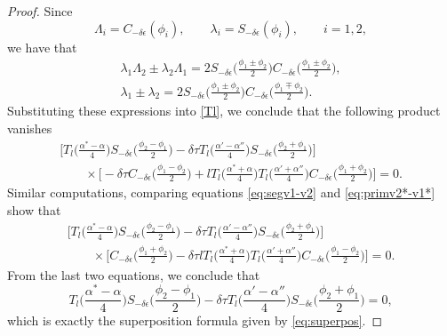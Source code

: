 \documentclass[pdftex]{sigma}
\numberwithin{equation}{section}
\begin{document}
\begin{proof}
Since
\[
\Lambda_i=C_{-\delta\epsilon}(\phi_i) , \qquad \lambda_i=S_{-\delta\epsilon}(\phi_i), \qquad i=1,2,
\]
we have that
\begin{gather*}
\lambda_1\Lambda_2\pm\lambda_2\Lambda_1=2
S_{-\delta\epsilon}\biggl(\frac{\phi_1\pm \phi_2}{2}\biggr)C_{-\delta\epsilon}\biggl(\frac{\phi_1\pm \phi_2}{2}\biggr),
\\
\lambda_1\pm\lambda_2= 2 S_{-\delta\epsilon}\biggl(\frac{\phi_1\pm \phi_2}{2}\biggr)
C_{-\delta\epsilon}\biggl(\frac{\phi_1\mp \phi_2}{2}\biggr).
\end{gather*}
Substituting these expressions into \eqref{Tl}, we conclude that the following product vanishes
\begin{gather*}
 \biggl[T_l\biggl(\frac{\alpha^*-\alpha}{4}\biggr) S_{-\delta\epsilon}\biggl(\frac{\phi_2-\phi_1}{2}\biggr)-\delta\tau
T_l\biggl(\frac{\alpha'-\alpha''}{4}\biggr) S_{-\delta\epsilon}\biggl(\frac{\phi_2+\phi_1}{2}\biggr)\biggr] \\
 \qquad{}\times\biggl[ -\delta\tau C_{-\delta\epsilon}\biggl(\frac{\phi_1-\phi_2}{2}\biggr)+l T_l\biggl(\frac{\alpha^*+\alpha}{4}\biggr)
T_l\biggl(\frac{\alpha'+\alpha''}{4}\biggr) C_{-\delta\epsilon}\biggl(\frac{\phi_1+\phi_2}{2}\biggr) \biggr]=0.
\end{gather*}
Similar computations, comparing equations \eqref{eq:segv1-v2} and \eqref{eq:primv2*-v1*}
show that
\begin{gather*}
 \biggl[T_l\biggl(\frac{\alpha^*-\alpha}{4}\biggr) S_{-\delta\epsilon}\biggl(\frac{\phi_2-\phi_1}{2}\biggr)-\delta\tau
T_l\biggl(\frac{\alpha'-\alpha''}{4}\biggr) S_{-\delta\epsilon}\biggl(\frac{\phi_2+\phi_1}{2}\biggr)\biggr] \\
 \qquad{}\times\biggl[ C_{-\delta\epsilon}\biggl(\frac{\phi_1+\phi_2}{2}\biggr)-\delta\tau l T_l\biggl(\frac{\alpha^*+\alpha}{4}\biggr)
T_l\biggl(\frac{\alpha'+\alpha''}{4}\biggr) C_{-\delta\epsilon}\biggl(\frac{\phi_1-\phi_2}{2}\biggr) \biggr]=0.
\end{gather*}
From the last two equations, we conclude that
\[
T_l\biggl(\frac{\alpha^*-\alpha}{4}\biggr) S_{-\delta\epsilon}\biggl(\frac{\phi_2-\phi_1}{2}\biggr)-\delta\tau
T_l\biggl(\frac{\alpha'-\alpha''}{4}\biggr) S_{-\delta\epsilon}\biggl(\frac{\phi_2+\phi_1}{2}\biggr)=0,
\]
which is exactly the superposition formula given by \eqref{eq:superpos}.


\end{proof}
\end{document}
